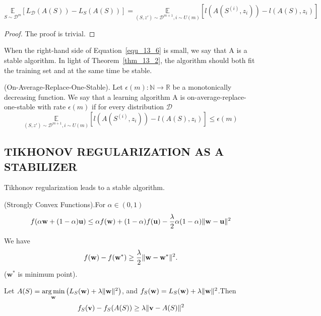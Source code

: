 \begin{thm}
	\label{thm_13_2}
	\begin{equation}
		\label{equ_13_6}
		\underset{S \sim \mathcal{D}^m} {\mathbb{E}}
		[L_{\mathcal{D}}(A(S)) - L_S(A(S))]
		= \underset{(S,z') \sim \mathcal{D}^{m+1}, i \sim U(m)} {\mathbb{E}}
		[l(A(S^{(i)}, z_i)) - l(A(S), z_i)]
	\end{equation}	
	\begin{proof}
		The proof is trivial.
	\end{proof}
\end{thm}
When the right-hand side of Equation~\ref{equ_13_6} is small, we say that A is a stable algorithm.
In light of Theorem~\ref{thm_13_2}, the algorithm should both fit the training set and at the same time be stable.

\begin{defn}
	(On-Average-Replace-One-Stable).
	Let $ \epsilon(m): \mathbb{N} \rightarrow \mathbb{R} $ be a monotonically decreasing function.
	We say that a learning algorithm A is on-average-replace-one-stable with rate $ \epsilon(m) $
	if for every distribution $ \mathcal{D} $
	\begin{equation}
		\underset{(S,z') \sim \mathcal{D}^{m+1}, i \sim U(m)} {\mathbb{E}}
		[l(A(S^{(i)}, z_i)) - l(A(S), z_i)] \le \epsilon(m)
	\end{equation}
\end{defn}

\subsection{TIKHONOV REGULARIZATION AS A STABILIZER}

Tikhonov regularization leads to a stable algorithm.
\begin{defn} (Strongly Convex Functions).For $ \alpha \in (0, 1) $
	\begin{equation}
		f( \alpha \mathbf{w} + (1-\alpha) \mathbf{u}) \le
		\alpha f(\mathbf{w}) + (1-\alpha) f(\mathbf{u})
		- \frac{\lambda}{2} \alpha (1-\alpha) \Arrowvert \mathbf{w} - \mathbf{u} \Arrowvert^2
	\end{equation}
\end{defn}

We have
\[ f(\mathbf{w}) - f(\mathbf{w}^*) \ge \frac{\lambda}{2} \Arrowvert \mathbf{w} - \mathbf{w}^* \Arrowvert^2.\]
($\mathbf{w}^*$ is minimum point).

Let $ A(S) = \underset{\mathbf{w}}{\arg\min} \left( L_S(\mathbf{w}) + \lambda \Arrowvert \mathbf{w} \Arrowvert^2 \right) $,
and $ f_S(\mathbf{w}) = L_S(\mathbf{w}) + \lambda \Arrowvert \mathbf{w} \Arrowvert^2 $.Then
\begin{equation}
	\label{equ_13_7}
	f_S(\mathbf{v}) - f_S(A(S)) \ge \lambda \Arrowvert \mathbf{v} - A(S) \Arrowvert^2
\end{equation}

